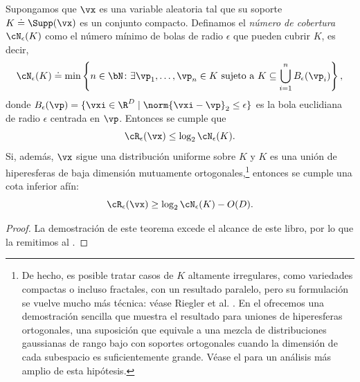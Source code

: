 \documentclass[../../book-main.tex]{subfiles}
\begin{document}
\begin{theorem}\label{thm:covering-number-rate-distortion}
    Supongamos que \(\vx\) es una variable aleatoria tal que su soporte
    \(K \doteq \Supp(\vx)\) es un conjunto compacto. Definamos el
    \textit{número de cobertura} \(\cN_{\epsilon}(K)\) como el número mínimo
    de bolas de radio \(\epsilon\) que pueden cubrir \(K\), es decir,
    \begin{equation}
        \cN_{\epsilon}(K) \doteq \min\left\{n \in \bN \colon \exists
            \vp_{1}, \dots, \vp_{n} \in K\ \text{sujeto a}\ K \subseteq
        \bigcup_{i = 1}^{n}B_{\epsilon}(\vp_{i})\right\},
    \end{equation}
    donde \(B_{\epsilon}(\vp) = \{\vxi \in \R^D \mid \norm{\vxi -
            \vp}_2 \leq
    \epsilon\}\) es la bola euclidiana de radio \(\epsilon\) centrada
    en \(\vp\).
    Entonces se cumple que
    \begin{equation}
        \cR_{\epsilon}(\vx)
        \leq \log_{2} \cN_{\epsilon}(K).
    \end{equation}
    Si, además, $\vx$ sigue una distribución uniforme sobre $K$ y $K$ es
    una unión de hiperesferas de baja dimensión mutuamente ortogonales,\footnote{De hecho, es
    posible tratar casos de $K$ altamente irregulares, como variedades compactas o incluso fractales,
    con un resultado paralelo,
    pero su formulación
    se vuelve mucho más técnica: véase Riegler et al.
    \cite{Riegler2018-jh,Riegler2023-rr}. En el
     ofrecemos una demostración sencilla que muestra el resultado
    para uniones de hiperesferas ortogonales, una suposición que equivale a
    una mezcla de distribuciones gaussianas de rango bajo con soportes ortogonales cuando la dimensión
    de cada subespacio es suficientemente grande. Véase el
     para un análisis más amplio de esta
    hipótesis.}
    entonces se cumple una cota inferior afín:
    \begin{equation}
        \cR_{\epsilon}(\vx)
        \geq
        \log_{2} \cN_{\epsilon}(K) - O(D).
    \end{equation}
\end{theorem}
\begin{proof}
    La demostración de este teorema excede el alcance de este libro, por lo que
    la remitimos al .
\end{proof}
\end{document}
